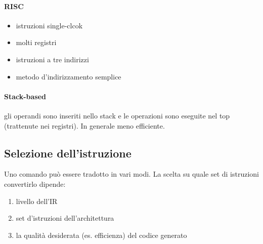 \paragraph{RISC}
\begin{itemize}
\item istruzioni single-clcok
\item molti registri
\item istruzioni a tre indirizzi
\item metodo d'indirizzamento semplice
\end{itemize}
\paragraph{Stack-based}
gli operandi sono inseriti nello stack e le operazioni sono eseguite nel top
(trattenute nei registri). In generale meno efficiente.

\subsection{Selezione dell'istruzione}
Uno comando pu\`o essere tradotto in vari modi. La scelta su quale set di
istruzioni convertirlo dipende:
\begin{enumerate}
\item livello dell'IR
\item set d'istruzioni dell'architettura
\item la qualit\`a desiderata (es. efficienza) del codice generato
\end{enumerate}
